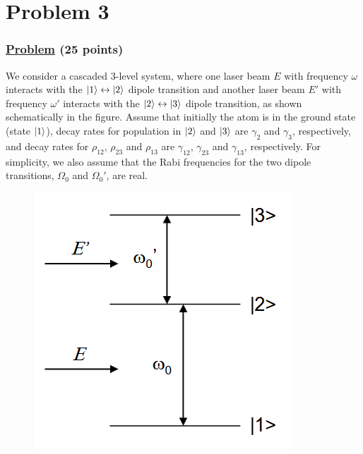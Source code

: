\documentclass[12pt]{article}
\begin{document}
\section*{Problem 3}
\subsubsection*{\underline{Problem} (25 points)}
We consider a cascaded 3-level system, where one laser beam $E$ with frequency $\omega$ interacts with the $\ket{1}\leftrightarrow\ket{2}$ dipole transition and another laser beam $E'$ with frequency $\omega'$ interacts with the $\ket{2}\leftrightarrow\ket{3}$ dipole transition, as shown schematically in the figure.
Assume that initially the atom is in the ground state (state $\ket{1}$), decay rates for population in $\ket{2}$ and $\ket{3}$ are $\gamma_2$ and $\gamma_3$, respectively, and decay rates for $\rho_{12}$, $\rho_{23}$ and $\rho_{13}$ are $\gamma_{12}$, $\gamma_{23}$ and $\gamma_{13}$, respectively.
For simplicity, we also assume that the Rabi frequencies for the two dipole transitions, $\Omega_0$ and $\Omega_0'$, are real.
\begin{figure}[h]
    \centering
    \includegraphics[scale=.75]{cascade.png}
\end{figure}
\end{document}
